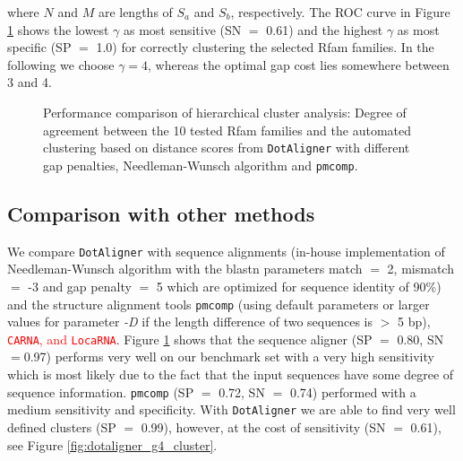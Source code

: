 \documentclass[a4paper,twoside]{article}
\newcommand\dotaligner{\texttt{DotAligner}}
\newcommand\pmcomp{\texttt{pmcomp}}
\newcommand\locarna{\texttt{LocaRNA}}
\newcommand\pvclust{\texttt{pvclust}}
\newcommand\carna{\texttt{CARNA}}
\newcommand{\RED}[1]{\textcolor{red}{#1}}
\begin{document}
where $N$ and $M$ are lengths of $S_a$ and $S_b$, respectively. The ROC curve in
Figure \ref{fig:roc} shows the lowest $\gamma$ as most sensitive (SN $=$ 0.61)
and the highest $\gamma$ as most specific (SP $=$ 1.0) for correctly clustering
the selected Rfam families. In the following we choose $\gamma=4$, whereas the
optimal gap cost lies somewhere between 3 and 4.

\begin{figure}[!h]
  \centering
    {}
  \caption{Performance comparison of hierarchical cluster analysis: Degree of
  agreement between the 10 tested Rfam families and the automated clustering
  based on distance scores from \dotaligner{} with different gap penalties,
  Needleman-Wunsch algorithm and \pmcomp{}.}
  \label{fig:roc}
\end{figure}



\subsection{Comparison with other methods}

\noindent We compare \dotaligner{} with sequence alignments (in-house
implementation of Needleman-Wunsch algorithm with the blastn parameters match
$=$ 2, mismatch $=$ -3 and gap penalty $=$ 5 which are optimized for sequence
identity of 90\%) and the structure alignment tools \pmcomp{} (using default
parameters or larger values for parameter \emph{-D} if the length difference of
two sequences is $>$ 5 bp), \RED{\carna, and \locarna}. Figure \ref{fig:roc}
shows that the sequence aligner (SP $=$ 0.80, SN $=$0.97) performs very well on
our benchmark set with a very high sensitivity which is most likely due to the
fact that the input sequences have some degree of sequence information.
\pmcomp{} (SP $=$ 0.72, SN $=$ 0.74) performed with a medium sensitivity and
specificity. With \dotaligner{} we are able to find very well defined clusters (SP
$=$ 0.99), however, at the cost of sensitivity (SN $=$ 0.61), see Figure
\ref{fig:dotaligner_g4_cluster}.

\begin{figure*}[!ht]
  \centering
  {}
  \caption{Automated hierarchical clustering of 300 sequences from 10 H/ACA
  snoRNA families. The dissimilarity matrix was calculated through \dotaligner{}
  with gap penalty 4. The clustering was conducted by the R-package \pvclust{}
  with multiscale bootstrap resampling with number of bootstrap 1000. We define
  clusters (red rectangles) as Approximately Unbiased (AU) \textit{p}-values $>$
  0.95 rejecting the hypothesis that ``the cluster does not exist`` with
  significance level 0.05.}
  \label{fig:dotaligner_g4_cluster}
\end{figure*}
\end{document}
